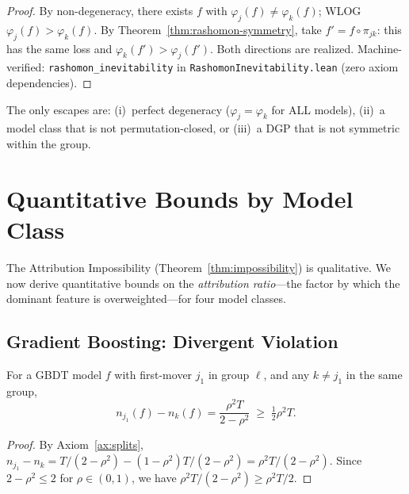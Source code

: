 \documentclass{jmlr}
\newcommand{\GBDT}{\textsc{GBDT}}
\begin{document}
\begin{proof}
By non-degeneracy, there exists $f$ with $\varphi_j(f) \neq \varphi_k(f)$; WLOG $\varphi_j(f) > \varphi_k(f)$. By Theorem~\ref{thm:rashomon-symmetry}, take $f' = f \circ \pi_{jk}$: this has the same loss and $\varphi_k(f') > \varphi_j(f')$. Both directions are realized. Machine-verified: \texttt{rashomon\_inevitability} in \texttt{RashomonInevitability.lean} (zero axiom dependencies).
\end{proof}

\begin{remark}
The only escapes are: (i)~perfect degeneracy ($\varphi_j = \varphi_k$ for ALL models), (ii)~a model class that is not permutation-closed, or (iii)~a DGP that is not symmetric within the group.
\end{remark}


\section{Quantitative Bounds by Model Class}
\label{sec:bounds}

The Attribution Impossibility (Theorem~\ref{thm:impossibility}) is qualitative. We now derive quantitative bounds on the \emph{attribution ratio}---the factor by which the dominant feature is overweighted---for four model classes.

\subsection{Gradient Boosting: Divergent Violation}
\label{sec:gbdt-bounds}

\begin{lemma}
\label{lem:split-gap}
For a \GBDT{} model $f$ with first-mover $j_1$ in group $\ell$, and any $k \neq j_1$ in the same group,
\[
    n_{j_1}(f) - n_k(f) = \frac{\rho^2 T}{2 - \rho^2} \;\geq\; \tfrac{1}{2}\rho^2 T.
\]
\end{lemma}

\begin{proof}
By Axiom~\ref{ax:splits}, $n_{j_1} - n_k = T/(2-\rho^2) - (1-\rho^2)T/(2-\rho^2) = \rho^2 T/(2-\rho^2)$.
Since $2 - \rho^2 \leq 2$ for $\rho \in (0,1)$, we have $\rho^2 T/(2-\rho^2) \geq \rho^2 T/2$.
\end{proof}
\end{document}
